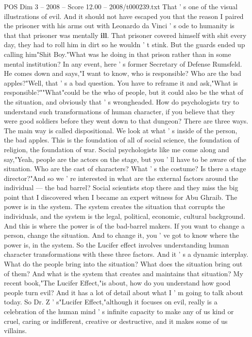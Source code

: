 \begin{textsample}{POS Dim 3 – 2008 – Score 12.00 – 2008/t000239.txt}
That ' s one of the visual illustrations of evil.
And it should not have escaped you that the reason I paired the prisoner with his arms out with Leonardo da Vinci ' s ode to humanity is that that prisoner was mentally \textbf{ill}.
That prisoner covered himself with shit every day, they had to roll him in dirt so he wouldn ' t stink.
But the guards ended up calling him"Shit Boy."What was he doing in that prison rather than in some mental institution?
In any event, here ' s former Secretary of Defense Rumsfeld.
He comes down and says,"I want to know, who is responsible?
Who are the bad apples?"Well, that ' s a bad question.
You have to reframe it and ask,"What is responsible?""What"could be the who of people, but it could also be the what of the situation, and obviously that ' s wrongheaded.
How do psychologists try to understand such transformations of human character, if you believe that they were good soldiers before they went down to that dungeon?
There are three ways.
The main way is called dispositional.
We look at what ' s inside of the person, the bad apples.
This is the foundation of all of social science, the foundation of religion, the foundation of war.
Social psychologists like me come along and say,"Yeah, people are the actors on the stage, but you ' ll have to be aware of the situation.
Who are the cast of characters?
What ' s the costume?
Is there a stage director?"And so we ' re interested in what are the external factors around the individual — the bad barrel?
Social scientists stop there and they miss the big point that I discovered when I became an expert witness for Abu Ghraib.
The power is in the system.
The system creates the situation that corrupts the individuals, and the system is the legal, political, economic, cultural background.
And this is where the power is of the bad-barrel makers.
If you want to change a person, change the situation.
And to change it, you ' ve got to know where the power is, in the system.
So the Lucifer effect involves understanding human character transformations with these three factors.
And it ' s a dynamic interplay.
What do the people bring into the situation?
What does the situation bring out of them?
And what is the system that creates and maintains that situation?
My recent book,"The Lucifer Effect,"is about, how do you understand how good people turn evil?
And it has a lot of detail about what I ' m going to talk about today.
So Dr.
Z ' s"Lucifer Effect,"although it focuses on evil, really is a celebration of the human mind ' s infinite capacity to make any of us kind or cruel, caring or indifferent, creative or destructive, and it makes some of us villains.

\end{textsample}

